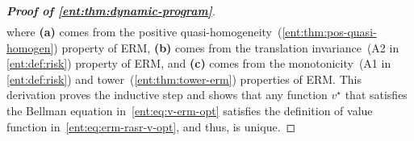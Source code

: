 \documentclass[twoside]{article}
\newcommand{\opt}{^\star}
\newcommand{\erm}[2]{\operatorname{ERM}_{#1}\left[#2\right]}
\theoremstyle{plain}
\theoremstyle{definition}
\theoremstyle{remark}
\begin{document}
\begin{proof}[\bf\em Proof of \cref{ent:thm:dynamic-program}]
\begin{align*}
\end{align*}
%
where {\bf (a)} comes from the positive quasi-homogeneity~(\cref{ent:thm:pos-quasi-homogen}) property of ERM, {\bf (b)} comes from the translation invariance~(A2 in \cref{ent:def:risk}) property of ERM, and {\bf (c)} comes from the monotonicity~(A1 in \cref{ent:def:risk}) and tower~(\cref{ent:thm:tower-erm}) properties of ERM. This derivation proves the inductive step and shows that any function $v^\star$ that satisfies the Bellman equation in~\eqref{ent:eq:v-erm-opt} satisfies the definition of value function in~\eqref{ent:eq:erm-rasr-v-opt}, and thus, is unique. 
\end{proof}



\end{document}
